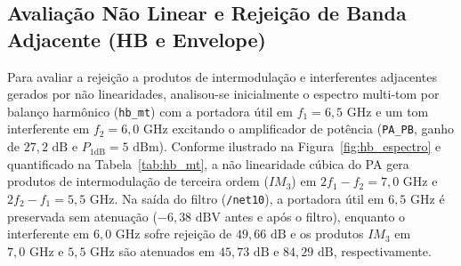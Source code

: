 \begin{table}[!htbp]
\centering
\caption{Comparação entre as especificações do projeto e os resultados simulados (AC e SP).}
\label{tab:resumo_specs}
\setlength{\tabcolsep}{3pt}
\end{table}

\subsection{Avaliação Não Linear e Rejeição de Banda Adjacente (HB e Envelope)}

Para avaliar a rejeição a produtos de intermodulação e interferentes adjacentes gerados por não linearidades, analisou-se inicialmente o espectro multi-tom por balanço harmônico (\texttt{hb\_mt}) com a portadora útil em $f_1 = 6{,}5\text{ GHz}$ e um tom interferente em $f_2 = 6{,}0\text{ GHz}$ excitando o amplificador de potência (\texttt{PA\_PB}, ganho de $27{,}2\text{ dB}$ e $P_{1\text{dB}} = 5\text{ dBm}$). Conforme ilustrado na Figura~\ref{fig:hb_espectro} e quantificado na Tabela~\ref{tab:hb_mt}, a não linearidade cúbica do PA gera produtos de intermodulação de terceira ordem ($IM_3$) em $2f_1 - f_2 = 7{,}0\text{ GHz}$ e $2f_2 - f_1 = 5{,}5\text{ GHz}$. Na saída do filtro (\texttt{/net10}), a portadora útil em $6{,}5\text{ GHz}$ é preservada sem atenuação ($-6{,}38\text{ dBV}$ antes e após o filtro), enquanto o interferente em $6{,}0\text{ GHz}$ sofre rejeição de $49{,}66\text{ dB}$ e os produtos $IM_3$ em $7{,}0\text{ GHz}$ e $5{,}5\text{ GHz}$ são atenuados em $45{,}73\text{ dB}$ e $84{,}29\text{ dB}$, respectivamente.

